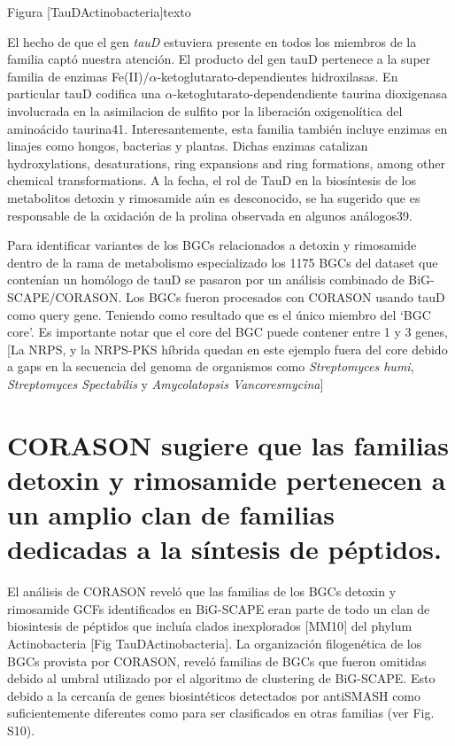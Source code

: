 \documentclass[12pt,twoside]{reedthesis}
\begin{document}
  Figura {[}TauDActinobacteria{]}texto
  
  El hecho de que el gen \emph{tauD} estuviera presente en todos los
  miembros de la familia captó nuestra atención. El producto del gen tauD
  pertenece a la super familia de enzimas
  Fe(II)/\(\alpha\)-ketoglutarato-dependientes hidroxilasas. En particular
  tauD codifica una \(\alpha\)-ketoglutarato-dependendiente taurina
  dioxigenasa involucrada en la asimilacion de sulfito por la liberación
  oxigenolítica del aminoácido taurina41. Interesantemente, esta familia
  también incluye enzimas en linajes como hongos, bacterias y plantas.
  Dichas enzimas catalizan hydroxylations, desaturations, ring expansions
  and ring formations, among other chemical transformations. A la fecha,
  el rol de TauD en la biosíntesis de los metabolitos detoxin y rimosamide
  aún es desconocido, se ha sugerido que es responsable de la oxidación de
  la prolina observada en algunos análogos39.
  
  Para identificar variantes de los BGCs relacionados a detoxin y
  rimosamide dentro de la rama de metabolismo especializado los 1175 BGCs
  del dataset que contenían un homólogo de tauD se pasaron por un análisis
  combinado de BiG-SCAPE/CORASON. Los BGCs fueron procesados con CORASON
  usando tauD como query gene. Teniendo como resultado que es el único
  miembro del `BGC core'. Es importante notar que el core del BGC puede
  contener entre 1 y 3 genes, {[}La NRPS, y la NRPS-PKS híbrida quedan en
  este ejemplo fuera del core debido a gaps en la secuencia del genoma de
  organismos como \emph{Streptomyces humi}, \emph{Streptomyces
  Spectabilis} y \emph{Amycolatopsis Vancoresmycina}{]}
  
  \chapter{CORASON sugiere que las familias detoxin y rimosamide
  pertenecen a un amplio clan de familias dedicadas a la síntesis de
  péptidos.}\label{corason-sugiere-que-las-familias-detoxin-y-rimosamide-pertenecen-a-un-amplio-clan-de-familias-dedicadas-a-la-sintesis-de-peptidos.}
  
  El análisis de CORASON reveló que las familias de los BGCs detoxin y
  rimosamide GCFs identificados en BiG-SCAPE eran parte de todo un clan de
  biosintesis de péptidos que incluía clados inexplorados {[}MM10{]} del
  phylum Actinobacteria {[}Fig TauDActinobacteria{]}. La organización
  filogenética de los BGCs provista por CORASON, reveló familias de BGCs
  que fueron omitidas debido al umbral utilizado por el algoritmo de
  clustering de BiG-SCAPE. Esto debido a la cercanía de genes
  biosintéticos detectados por antiSMASH como suficientemente diferentes
  como para ser clasificados en otras familias (ver Fig. S10).
  
\end{document}
